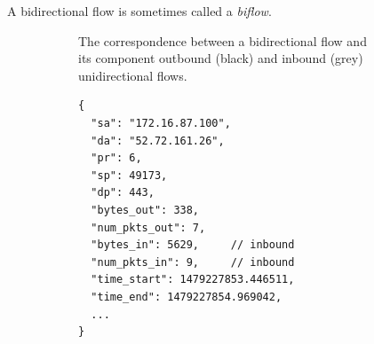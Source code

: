 \documentclass{book}
\begin{document}
A bidirectional flow is sometimes called a \textit{biflow}.

\begin{figure}
  \centering
\caption{Bidirectional flow examples.}
\begin{subfigure}{.45\textwidth}
  \centering
  \caption{ The correspondence between a bidirectional flow and its
    component outbound (black) and inbound (grey) unidirectional
    flows. }
\label{biflowexample}
\end{subfigure}
\hspace{22pt}
\begin{subfigure}{.45\textwidth}
  \centering
  \label{biexample}
\begin{verbatim}
{
  "sa": "172.16.87.100",
  "da": "52.72.161.26",
  "pr": 6,
  "sp": 49173,
  "dp": 443,
  "bytes_out": 338,
  "num_pkts_out": 7,
  "bytes_in": 5629,     // inbound                
  "num_pkts_in": 9,     // inbound                
  "time_start": 1479227853.446511,
  "time_end": 1479227854.969042,
  ...
}
\end{verbatim}
\end{subfigure}
\end{figure}
\end{document}
